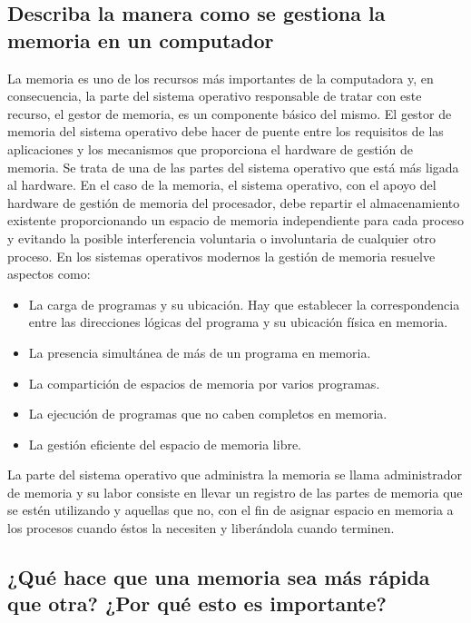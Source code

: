 \documentclass{article}
\begin{document}
\subsection{Describa la manera como se gestiona la memoria en un computador}
La memoria es uno de los recursos más importantes de la computadora y, en consecuencia, la parte del sistema operativo responsable de tratar con este recurso, el gestor de memoria, es un componente básico del mismo. El gestor de memoria del sistema operativo debe hacer de puente entre los requisitos de las aplicaciones y los mecanismos que proporciona el hardware de gestión de memoria. Se trata de una de las partes del sistema operativo que está más
ligada al hardware.
En el caso de la memoria, el sistema operativo, con el apoyo del hardware de gestión de
memoria del procesador, debe repartir el almacenamiento existente proporcionando un espacio
de memoria independiente para cada proceso y evitando la posible interferencia voluntaria o involuntaria de cualquier otro proceso.\cite{gm}\newline
 En los sistemas operativos modernos la
gestión de memoria resuelve aspectos como:
\begin{itemize}
    \item {La carga de programas y su ubicación. Hay que establecer la correspondencia
entre las direcciones lógicas del programa y su ubicación física en memoria.}
\item{ La presencia simultánea de más de un programa en memoria.}

\item{ La compartición de espacios de memoria por varios programas.}

\item{ La ejecución de programas que no caben completos en memoria.}
\item{ La gestión eficiente del espacio de memoria libre.}\cite{gestion} 
\end{itemize}
La parte del sistema operativo que administra la memoria se llama administrador de memoria y su labor consiste en llevar un registro de las partes de memoria que se estén utilizando y aquellas que no, con el fin de asignar espacio en memoria a los procesos cuando éstos la necesiten y liberándola cuando terminen.\cite{gestionm}







\subsection{¿Qué hace que una memoria sea más rápida que otra? ¿Por qué esto es importante?}
\end{document}
